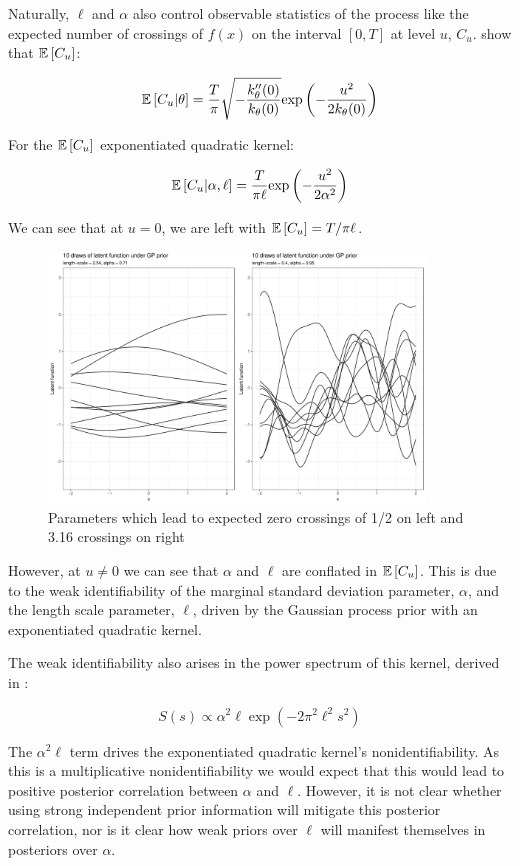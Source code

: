 \documentclass{article}
\newcommand{\Exp}[1]{\ensuremath{\mathbb{E} \lb #1 \rb}}
\newcommand{\lb}{\ensuremath{\left[}}
\newcommand{\rb}{\ensuremath{\right]}}
\begin{document}
Naturally, $\ell$ and $\alpha$ also control observable statistics of the
process like the expected number of crossings of $f(x)$ on the interval $[0,
T]$ at level $u$, $C_u$. \citet{cramer2004stationary} show that $\Exp{C_u}$:

\[ 
  \Exp{C_u | \theta} = \dfrac{T}{\pi} 
\sqrt{-\dfrac{k_\theta^{\prime \prime}(0)}{k_\theta(0)}}
  \text{exp}\left(-\dfrac{u^2}{2k_\theta(0)}\right)
\]

For the $\Exp{C_u}$ exponentiated quadratic kernel:

\[ 
  \Exp{C_u | \alpha, \ell} = \dfrac{T}{\pi \ell}\text{exp}\left(-\dfrac{u^2}{2 \alpha ^ 2} \right)
\]

We can see that at $u = 0$, we are left with $\Exp{C_u} = T / \pi \ell$.  

\begin{figure}[h] \label{prior_lat_draws}
  \centering
  \includegraphics[width=100mm]{plots/latent_draws_comparison.pdf}
  \caption{Parameters which lead to expected zero crossings of 1/2 on left and 3.16 crossings on right}
\end{figure}

However, at $u \neq 0$ we can see that $\alpha$ and $\ell$ are conflated in
$\Exp{C_u}$. This is due to the weak identifiability of the marginal standard
deviation parameter, $\alpha$, and the length scale parameter, $\ell$, driven 
by the Gaussian process prior with an exponentiated quadratic kernel.

The weak identifiability also arises in the power spectrum of this kernel,
derived in \citet{rasmussen2006gaussian}:

\[
  S(s) \propto \alpha^2 \ell
   \exp \left(
  - 2 \pi^2 \ell^2 s^2
\right)
\]

The $\alpha ^ 2 \ell$ term drives the exponentiated quadratic kernel's
nonidentifiability. As this is a multiplicative nonidentifiability we would
expect that this would lead to positive posterior correlation between $\alpha$
and $\ell$. However, it is not clear whether using strong independent prior
information will mitigate this posterior correlation, nor is it clear how weak
priors over $\ell$ will manifest themselves in posteriors over $\alpha$. 
\end{document}
